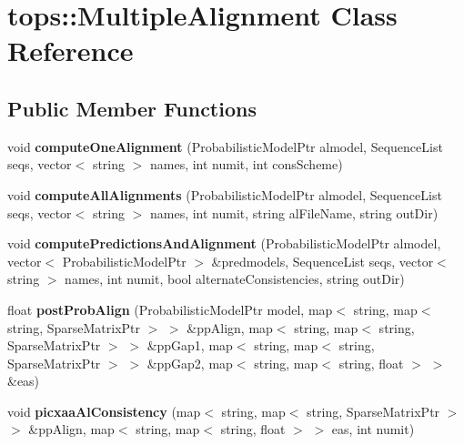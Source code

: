 \hypertarget{classtops_1_1MultipleAlignment}{}\section{tops\+:\+:Multiple\+Alignment Class Reference}
\label{classtops_1_1MultipleAlignment}
\subsection*{Public Member Functions}
\begin{DoxyCompactItemize}
\item 
\mbox{\label{classtops_1_1MultipleAlignment_a22470ebec1497089a3d67fc16831964b}} 
void {\bfseries compute\+One\+Alignment} (Probabilistic\+Model\+Ptr almodel, Sequence\+List seqs, vector$<$ string $>$ names, int numit, int cons\+Scheme)
\item 
\mbox{\label{classtops_1_1MultipleAlignment_aa354bdf39e2ad92e7d3fcf1b2da55944}} 
void {\bfseries compute\+All\+Alignments} (Probabilistic\+Model\+Ptr almodel, Sequence\+List seqs, vector$<$ string $>$ names, int numit, string al\+File\+Name, string out\+Dir)
\item 
\mbox{\label{classtops_1_1MultipleAlignment_aaa37920bf8831c9816ef2a59ad726718}} 
void {\bfseries compute\+Predictions\+And\+Alignment} (Probabilistic\+Model\+Ptr almodel, vector$<$ Probabilistic\+Model\+Ptr $>$ \&predmodels, Sequence\+List seqs, vector$<$ string $>$ names, int numit, bool alternate\+Consistencies, string out\+Dir)
\item 
\mbox{\label{classtops_1_1MultipleAlignment_a4869247f263de3ab3d54d32f997e214b}} 
float {\bfseries post\+Prob\+Align} (Probabilistic\+Model\+Ptr model, map$<$ string, map$<$ string, Sparse\+Matrix\+Ptr $>$ $>$ \&pp\+Align, map$<$ string, map$<$ string, Sparse\+Matrix\+Ptr $>$ $>$ \&pp\+Gap1, map$<$ string, map$<$ string, Sparse\+Matrix\+Ptr $>$ $>$ \&pp\+Gap2, map$<$ string, map$<$ string, float $>$ $>$ \&eas)
\item 
\mbox{\label{classtops_1_1MultipleAlignment_ab8956ea130a048f79a9033a83d4baf40}} 
void {\bfseries picxaa\+Al\+Consistency} (map$<$ string, map$<$ string, Sparse\+Matrix\+Ptr $>$ $>$ \&pp\+Align, map$<$ string, map$<$ string, float $>$ $>$ eas, int numit)

\end{DoxyCompactItemize}
